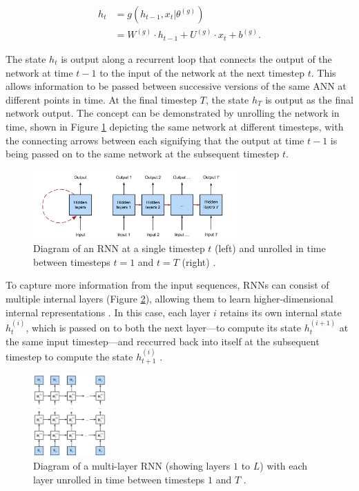 \documentclass[a4paper, 11pt]{report}
\begin{document}
    \begin{align}
        \label{eq: rnn-state}
        h_t &= g( h_{t-1}, x_t \vert \theta^{(g)} ) \\
        &= W^{(g)} \cdot h_{t-1} + U^{(g)} \cdot x_t + b^{(g)}
        \text{.}
    \end{align}

    The state $h_t$ is output along a recurrent loop that connects the output of the network at time $t-1$ to the input of the network at the next timestep $t$. This allows information to be passed between successive versions of the same ANN at different points in time. At the final timestep $T$, the state $h_T$ is output as the final network output. The concept can be demonstrated by unrolling the network in time, shown in Figure \ref{fig: rnn-diagram} depicting the same network at different timesteps, with the connecting arrows between each signifying that the output at time $t-1$ is being passed on to the same network at the subsequent timestep $t$.

    \begin{figure}[ht]
        \centering
        \includegraphics[width=0.7\textwidth]{rnn.png}
        \caption{\centering Diagram of an RNN at a single timestep $t$ (left) and unrolled in time between timesteps $t=1$ and $t=T$ (right) \citep{zhang-2021}.}
        \label{fig: rnn-diagram}
    \end{figure}

    To capture more information from the input sequences, RNNs can consist of multiple internal layers (Figure \ref{fig: deep-rnn}), allowing them to learn higher-dimensional internal representations \citep{bengio-2009}. In this case, each layer $i$ retains its own internal state $h^{(i)}_t$, which is passed on to both the next layer---to compute its state $h^{(i+1)}_t$ at the same input timestep---and reccurred back into itself at the subsequent timestep to compute the state $h^{(i)}_{t+1}$ \citep{zhang-2021}. 

    \begin{figure}[ht]
        \centering
        \includegraphics[width=0.25\textwidth]{deep-rnn.png}
        \caption{\centering Diagram of a multi-layer RNN (showing layers $1$ to $L$) with each layer unrolled in time between timesteps $1$ and $T$ \citep{zhang-2021}.}
        \label{fig: deep-rnn}
    \end{figure}
\end{document}

